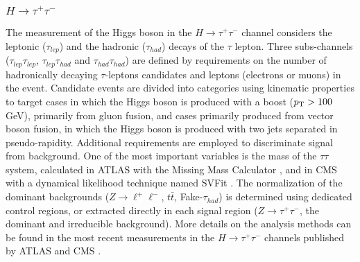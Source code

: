 


\subsubsection{$H \to \tau^{+}\tau^{-}$}
The measurement of the Higgs boson  in the $H \to \tau^{+}\tau^{-}$ channel considers the leptonic ($\tau_{lep}$) and the hadronic ($\tau_{had}$) decays of the $\tau$ lepton. Three subs-channels ($\tau_{lep}\tau_{lep}$, $\tau_{lep}\tau_{had}$ and $\tau_{had}\tau_{had}$) are defined by requirements on the number of hadronically decaying $\tau$-leptons candidates and leptons (electrons or muons) in the event.
Candidate events are divided into categories using kinematic properties to target cases in which the Higgs boson is produced with a  boost ($p\sb{\scriptstyle\mathrm{T}} > 100$ GeV), primarily from gluon  fusion, and cases primarily produced from vector boson fusion, in which the Higgs boson is produced with two jets separated in pseudo-rapidity. Additional requirements are employed to discriminate signal from background. One of the most important variables is the mass of the $\tau\tau$ system, calculated in ATLAS with the Missing Mass Calculator \cite{Elagin:2010aw}, and in CMS with a  dynamical likelihood technique named SVFit \cite{Bianchini:2014vza}.
The normalization of the dominant backgrounds ($Z\to\ell^{+}\ell^{-}$, $t\bar{t}$, Fake-$\tau_{had}$) is determined using dedicated control regions, or extracted directly in each signal region ($Z\to\tau^{+}\tau^{-}$, the dominant and irreducible background).  More details on the analysis methods can be found in the most recent measurements in the  $H \to \tau^{+}\tau^{-}$ channels published by ATLAS \cite{Aaboud:2018pen} and CMS \cite{Sirunyan:2017khh}.

